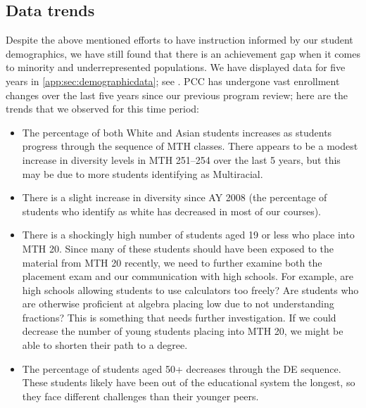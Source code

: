 \subsection{Data trends}\label{needs:sec:trends}
Despite the above mentioned efforts to have instruction informed by our student demographics, we have still found that there is an achievement gap when it comes to minority and underrepresented populations.
We have displayed data for five years in \vref{app:sec:demographicdata}; see .
PCC has undergone vast enrollment changes over the last five years since our previous program review; here are the trends that we observed for this time period: \begin{itemize} \item The percentage of both White and Asian students increases as students progress through the sequence of MTH classes.
	      There appears to be a modest increase in diversity levels in MTH 251--254 over the last 5 years, but this may be due to more students identifying as Multiracial.
	\item There is a slight increase in diversity since AY 2008 (the percentage
	      of students who identify as white has decreased in most of our courses).
	\item There is a shockingly high number of students aged 19 or less who
	      place into MTH 20.
	      Since many of these students should have been exposed to the material from MTH 20 recently, we need to further examine both the placement exam and our communication with high schools.
	      For example, are high schools allowing students to use calculators too freely?
	      Are students who are otherwise proficient at algebra placing low due to not understanding fractions?
	      This is something that needs further investigation.
	      If we could decrease the number of young students placing into MTH 20, we might be able to shorten their path to a degree.
	\item The percentage of students aged 50+ decreases through the DE
	      sequence.
	      These students likely have been out of the educational system the longest, so they face different challenges than their younger peers.


\end{itemize}
